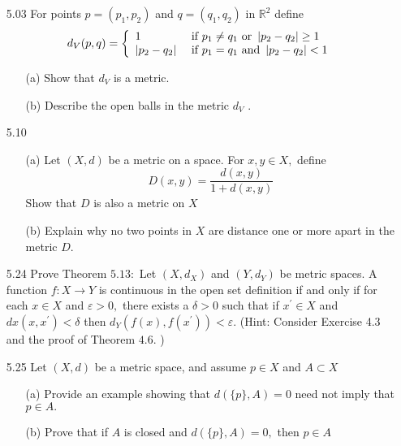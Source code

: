\documentclass[12pt]{article}
\begin{document}
\begin{enumerate}
	\item[5.03] For points $p = \left( p _ { 1 } , p _ { 2 } \right)$ and $q = \left( q _ { 1 } , q _ { 2 } \right)$ in $\mathbb { R } ^ { 2 }$ define
		\[d _ { V } ( p , q ) = \left\{ \begin{array} { l l } { 1 } & { \text { if } p _ { 1 } \neq q _ { 1 } \text { or } \left| p _ { 2 } - q _ { 2 } \right| \geq 1 } \\ { \left| p _ { 2 } - q _ { 2 } \right| } & { \text { if } p _ { 1 } = q _ { 1 } \text { and } \left| p _ { 2 } - q _ { 2 } \right| < 1 } \end{array} \right.\]
	\begin{enumerate}
		\item[(a)] Show that $d _ { V }$ is a metric.
	
		\item[(b)] 	Describe the open balls in the metric $d _ { V }$ .
	\end{enumerate}
	\item[5.10]
	\begin{enumerate}
		\item[(a)] Let $( X , d )$ be a metric on a space. For $x , y \in X ,$ define
		\[D ( x , y ) = \frac { d ( x , y ) } { 1 + d ( x , y ) }\]
		Show that $D$ is also a metric on $ X $
		
		\item[(b)] Explain why no two points in $X$ are distance one or more apart in the
		metric $D .$
	\end{enumerate}
	
	\item[5.24] Prove Theorem $5.13 :$ Let $\left( X , d _ { X } \right)$ and $\left( Y , d _ { Y } \right)$ be metric spaces. A function
	$f : X \rightarrow Y$ is continuous in the open set definition if and only if for each $x \in X$ and $\varepsilon > 0 ,$ there exists a $\delta > 0$ such that if $x ^ { \prime } \in X$ and $d x \left( x , x ^ { \prime } \right) < \delta$
	then $d _ { Y } \left( f ( x ) , f \left( x ^ { \prime } \right) \right) < \varepsilon .$ (Hint: Consider Exercise 4.3 and the proof of
	Theorem $4.6 .$ )
	
	\item[5.25] Let $( X , d )$ be a metric space, and assume $p \in X$ and $A \subset X$
	\begin{enumerate}
		\item[(a)] Provide an example showing that $d ( \{ p \} , A ) = 0$ need not imply that $p \in A .$
		
		\item[(b)] Prove that if $A$ is closed and $d ( \{ p \} , A ) = 0 ,$ then $p \in A$
		

\end{enumerate}
\end{enumerate}
\end{document}
